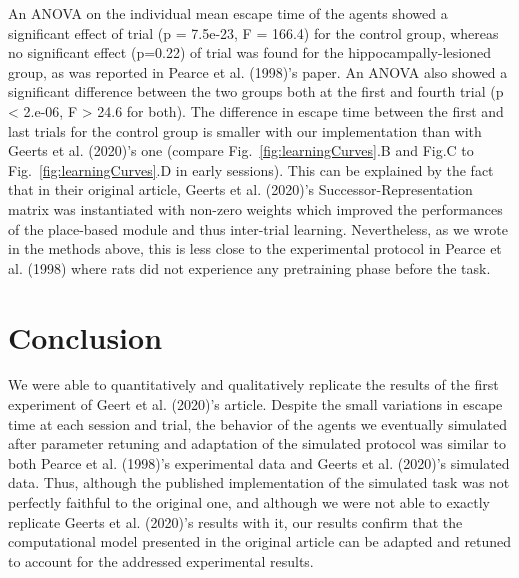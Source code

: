 An ANOVA on the individual mean escape time of the agents showed a significant effect of trial (p = 7.5e-23, F = 166.4) for the control group, whereas no  significant effect (p=0.22) of trial was found for the hippocampally-lesioned group, as was reported in Pearce et al. (1998)'s paper. An ANOVA also showed a significant difference between the two groups both at the first and fourth trial (p < 2.e-06, F > 24.6 for both). The difference in escape time between the first and last trials for the control group is smaller with our implementation than with Geerts et al. (2020)'s one (compare Fig.~\ref{fig:learningCurves}.B and Fig.C to Fig.~\ref{fig:learningCurves}.D in early sessions). This can be explained by the fact that in their original article, Geerts et al. (2020)'s Successor-Representation matrix was instantiated with non-zero weights which improved the performances of the place-based module and thus inter-trial learning. Nevertheless, as we wrote in the methods above, this is less close to the experimental protocol in Pearce et al. (1998) where rats did not experience any pretraining phase before the task.

\section{Conclusion}
We were able to quantitatively and qualitatively replicate the results of the first experiment of Geert et al. (2020)'s article. Despite the small variations in escape time at each session and trial, the behavior of the agents we eventually simulated after parameter retuning and adaptation of the simulated protocol was similar to both Pearce et al. (1998)'s experimental data and Geerts et al. (2020)'s simulated data. Thus, although the published implementation of the simulated task was not perfectly faithful to the original one, and although we were not able to exactly replicate Geerts et al. (2020)'s results with it, our results confirm that the computational model presented in the original article can be adapted and retuned to account for the addressed experimental results.





